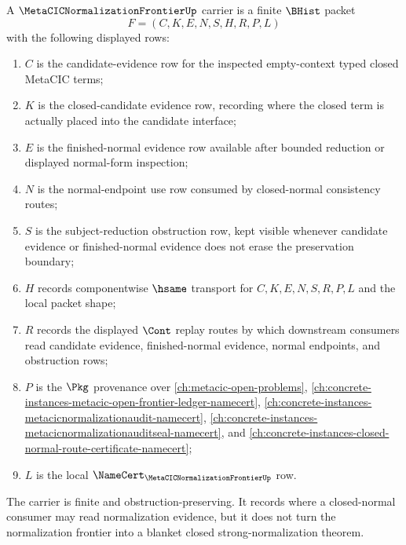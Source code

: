 \begin{definition}
\label{def:metacic-normalization-frontier-carrier}
A $\MetaCICNormalizationFrontierUp$ carrier is a finite $\BHist$ packet
$$
F=(C,K,E,N,S,H,R,P,L)
$$
with the following displayed rows:
\begin{enumerate}
\item $C$ is the candidate-evidence row for the inspected empty-context typed closed MetaCIC terms;
\item $K$ is the closed-candidate evidence row, recording where the closed term is actually placed into the candidate interface;
\item $E$ is the finished-normal evidence row available after bounded reduction or displayed normal-form inspection;
\item $N$ is the normal-endpoint use row consumed by closed-normal consistency routes;
\item $S$ is the subject-reduction obstruction row, kept visible whenever candidate evidence or finished-normal evidence does not erase the preservation boundary;
\item $H$ records componentwise $\hsame$ transport for $C,K,E,N,S,R,P,L$ and the local packet shape;
\item $R$ records the displayed $\Cont$ replay routes by which downstream consumers read candidate evidence, finished-normal evidence, normal endpoints, and obstruction rows;
\item $P$ is the $\Pkg$ provenance over \autoref{ch:metacic-open-problems}, \autoref{ch:concrete-instances-metacic-open-frontier-ledger-namecert}, \autoref{ch:concrete-instances-metacicnormalizationaudit-namecert}, \autoref{ch:concrete-instances-metacicnormalizationauditseal-namecert}, and \autoref{ch:concrete-instances-closed-normal-route-certificate-namecert};
\item $L$ is the local $\NameCert_{\MetaCICNormalizationFrontierUp}$ row.
\end{enumerate}
The carrier is finite and obstruction-preserving. It records where a closed-normal consumer may read normalization evidence, but it does not turn the normalization frontier into a blanket closed strong-normalization theorem.
\end{definition}

